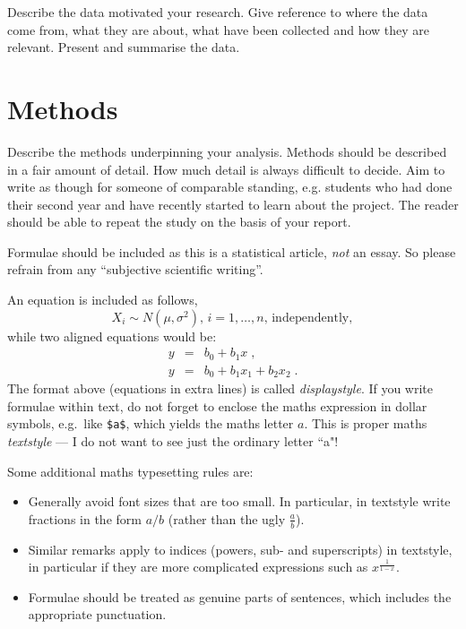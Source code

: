 \documentclass[a4paper,amsmath, 12pt]{article}
\begin{document}
Describe the data motivated your research. Give reference to where the data come from, what they are about, what have been collected and how they are relevant. Present and summarise the data.

\section{Methods}

Describe the methods underpinning your analysis. Methods should be described in a fair amount of detail. How much detail is always difficult to decide.  Aim to write as though for someone of comparable standing, e.g.  students who had done their second year and have recently started to learn about the project. The reader should be able to repeat the study on the basis of your report.

Formulae should be included as this is a statistical article, \textit{not} an essay. So please refrain from any ``subjective scientific writing''.

An equation is included as follows,
%
\begin{equation}
  X_i \sim N\left(\mu,\sigma^2\right), \, i = 1, \ldots, n, \, \mbox{independently},
\end{equation}
%
while two aligned equations would be:
%
\begin{eqnarray}
  y &=& b_0+b_1x \; , \\
  y &=& b_0+b_1x_1+b_2x_2 \; .
\end{eqnarray}
%
The format above (equations in extra lines) is called \textit{displaystyle}. If you write formulae within text, do not forget to enclose the maths expression in dollar symbols, e.g.\ like \verb|$a$|, which yields the maths letter $a$. This is proper maths  \textit{textstyle} --- I do not want to see just the ordinary letter ``a"!


Some additional maths typesetting rules are:
%
\begin{itemize}
\item Generally avoid font sizes that are too small. In particular, in textstyle write fractions in the form $a/b$ (rather than the ugly $\frac{a}{b}$).

\item Similar remarks apply to indices (powers, sub- and superscripts) in textstyle, in particular if they are more complicated expressions such as $x^{\frac{1}{1-x}}$.

\item Formulae should be treated as genuine parts of sentences, which includes the appropriate punctuation.
\end{itemize}
\end{document}
